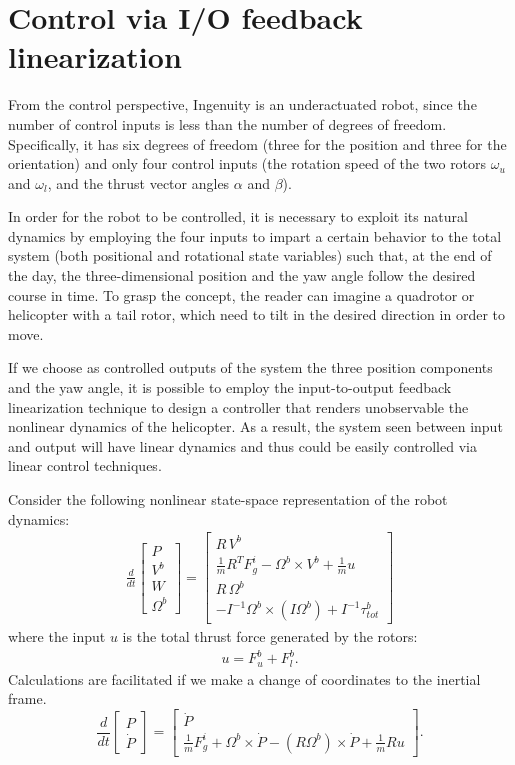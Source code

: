 \section{Control via I/O feedback linearization}
From the control perspective, Ingenuity is an underactuated robot, since the number of control inputs is less than the number of degrees of freedom. Specifically, it has six degrees of freedom (three for the position and three for the orientation) and only four control inputs (the rotation speed of the two rotors $\omega_u$ and $\omega_l$, and the thrust vector angles $\alpha$ and $\beta$). 

In order for the robot to be controlled, it is necessary to exploit its natural dynamics by employing the four inputs  to impart a certain behavior to the total system (both positional and rotational state variables) such that, at the end of the day, the three-dimensional position and the yaw angle follow the desired course in time. To grasp the concept, the reader can imagine a quadrotor or helicopter with a tail rotor, which need to tilt in the desired direction in order to move.

If we choose as controlled outputs of the system the three position components and the yaw angle, it is possible to employ the input-to-output feedback linearization technique to design a controller that renders unobservable the nonlinear dynamics of the helicopter. As a result, the system seen between input and output will have linear dynamics and thus could be easily controlled via linear control techniques.

Consider the following nonlinear state-space representation of the robot dynamics:
\begin{align}
    \frac{d}{dt} \begin{bmatrix}
        P \\ V^b \\ W \\ \Omega^b
    \end{bmatrix} = \begin{bmatrix}
        R \, V^b \\ \frac{1}{m} R^T F_g^i -\Omega^b \times V^b + \frac{1}{m} u \\ R \, \Omega^b \\ -I^{-1} \Omega^b \times (I \Omega^b)+I^{-1}\tau_{tot}^b 
    \end{bmatrix}
    \label{eq:fbl_model}
\end{align}
where the input $u$ is the total thrust force generated by the rotors: 
\begin{align}
    u = F_u^b + F_l^b.    
    \label{eq:u} 
\end{align}
Calculations are facilitated if we make a change of coordinates to the inertial frame. 
$$ \frac{d}{dt} \begin{bmatrix}
    P \\ \dot{P}
\end{bmatrix} = \begin{bmatrix}
    \dot{P} \\ \frac{1}{m} F_g^i + \Omega^b \times \dot{P} - (R \Omega^b) \times \dot{P} + \frac{1}{m} R u
\end{bmatrix}. $$

